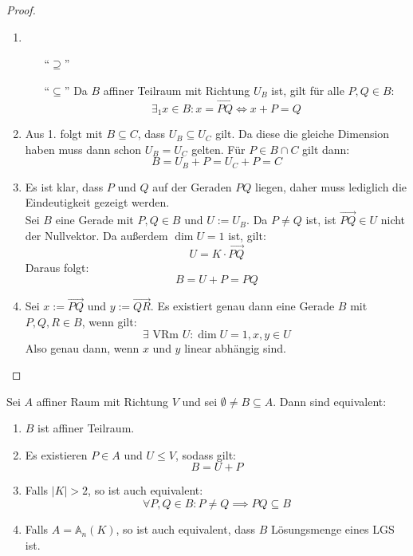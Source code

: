 \documentclass[parskip,a4paper,twoside,DIV15,BCOR12mm]{scrbook}
\begin{document}
\begin{proof}
\begin{enumerate}
\item 
\begin{enumerate}
\item["`$\supseteq$"']\checkmark
\item["`$\subseteq$"'] Da $B$ affiner Teilraum mit Richtung $U_B$ ist, gilt für alle $P,Q\in B$:
\[\exists_1 x\in B: x=\overrightarrow{PQ} \iff x+P = Q\]
\end{enumerate}
\item Aus 1. folgt mit $B\subseteq C$, dass $U_B\subseteq U_C$ gilt. Da diese die
gleiche Dimension haben muss dann schon $U_B=U_C$ gelten. Für $P\in B\cap C$ gilt dann:
\[B=U_B+P=U_C+P=C\]
\item Es ist klar, dass $P$ und $Q$ auf der Geraden $PQ$ liegen, daher muss lediglich die
Eindeutigkeit gezeigt werden.\\
Sei $B$ eine Gerade mit $P,Q\in B$ und $U:=U_B$. Da $P\ne Q$ ist, 
ist $\overrightarrow{PQ}\in U$ nicht der Nullvektor. Da außerdem $\dim U=1$ ist, gilt:
\[U=K\cdot\overrightarrow{PQ}\]
Daraus folgt:
\[B=U+P=PQ\]
\item Sei $x:=\overrightarrow{PQ}$ und $y:=\overrightarrow{QR}$. Es existiert genau dann
eine Gerade $B$ mit $P,Q,R\in B$, wenn gilt:
\[\exists\text{ VRm }U: \dim U=1, x,y\in U\]
Also genau dann, wenn $x$ und $y$ linear abhängig sind.
\end{enumerate}
\end{proof}

\begin{theo}[Teilraumkriterium]
Sei $A$ affiner Raum mit Richtung $V$ und sei $\emptyset \ne B\subseteq A$. Dann 
sind equivalent:
\begin{enumerate}
\item $B$ ist affiner Teilraum.
\item Es existieren $P\in A$ und $U\le V$, sodass gilt:
\[B=U+P\]
\item Falls $|K| >2$, so ist auch equivalent:
\[\forall P,Q\in B: P\ne Q \implies PQ \subseteq B\]
\item Falls $A=\mathbb{A}_n(K)$, so ist auch equivalent, dass $B$ Lösungsmenge eines LGS ist.
\end{enumerate}
\end{theo}
\end{document}
